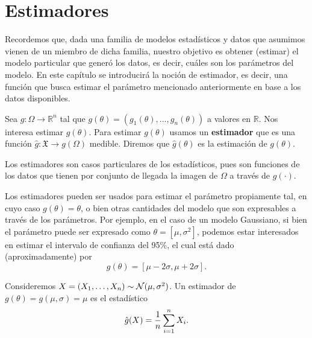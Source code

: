

\chapter{Estimadores}


Recordemos que, dada una familia de modelos estadísticos y datos que asumimos vienen de un miembro de dicha familia, nuestro objetivo es obtener (estimar) el modelo particular que generó los datos, es decir, cuáles son los parámetros del modelo. En este capítulo se introducirá la noción de estimador, es decir, una función que busca estimar el parámetro mencionado anteriormente en base a los datos disponibles.

\begin{definition}[Estimador]
    Sea $g:\Omega\rightarrow \mathbb{R}^n$  tal que $g(\theta) = (g_1(\theta),...,g_n(\theta))$ a valores en $\mathbb{R}$. Nos interesa estimar $g(\theta)$. Para estimar $g(\theta)$ usamos un \textbf{estimador} que es una función $\hat{g}:\mathfrak{X}\rightarrow g(\Omega)$ medible. Diremos que $\hat{g}(\theta)$ es la estimación de $g(\theta)$. 
    
\end{definition}

\begin{remark}
    Los estimadores son casos particulares de los estadísticos, pues son funciones de los datos que tienen por conjunto de llegada la imagen de $\Omega$ a través de $g(\cdot)$.
\end{remark}

\begin{remark}
    Los estimadores pueden ser usados para estimar el parámetro propiamente tal, en cuyo caso $g(\theta)=\theta$, o bien otras cantidades del modelo que son expresables a través de los parámetros. Por ejemplo, en el caso de un modelo Gaussiano, si bien el parámetro puede ser expresado como $\theta = [\mu,\sigma^2]$, podemos estar interesados en estimar el intervalo de confianza del 95\%, el cual está dado (aproximadamente) por 
    \begin{equation}
        g(\theta) = [\mu - 2\sigma,\mu + 2\sigma].
    \end{equation}
\end{remark}

\begin{example}
	\label{ex:estimador_media}
	Consideremos $X = (X_1,\ldots,X_n)\sim{\mathcal N}(\mu,\sigma^2)$. Un estimador de $g(\theta) = g(\mu,\sigma) = \mu$ es el estadístico 
	\begin{equation}
	\nonumber
		{ \hat{g}}(X) = \frac{1}{n}\sum_{i=1}^nX_i.
	\end{equation} 
\end{example}




